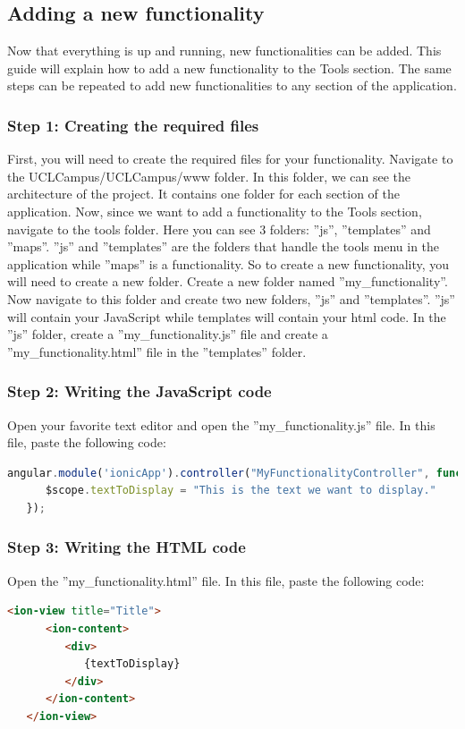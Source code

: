 \documentclass{eplmastersthesis}
\begin{document}
\subsection{Adding a new functionality}
Now that everything is up and running, new functionalities can be added. This guide will explain how to add a new functionality to the Tools section. The same steps can be repeated to add new functionalities to any section of the application.
\subsubsection{Step 1: Creating the required files}
First, you will need to create the required files for your functionality. Navigate to the UCLCampus/UCLCampus/www folder. In this folder, we can see the architecture of the project. It contains one folder for each section of the application. Now, since we want to add a functionality to the Tools section, navigate to the tools folder. Here you can see 3 folders: ''js'', ''templates'' and ''maps''. ''js'' and ''templates'' are the folders that handle the tools menu in the application while ''maps'' is a functionality. So to create a new functionality, you will need to create a new folder.
Create a new folder named ''my\_functionality''. Now navigate to this folder and create two new folders, ''js'' and ''templates''. ''js'' will contain your JavaScript while templates will contain your html code. In the ''js'' folder, create a ''my\_functionality.js'' file and create a ''my\_functionality.html'' file in the ''templates'' folder.
\subsubsection{Step 2: Writing the JavaScript code}
Open your favorite text editor and open the ''my\_functionality.js'' file. In this file, paste the following code:
\begin{lstlisting}[language=JavaScript]
   angular.module('ionicApp').controller("MyFunctionalityController", function($scope) {
      $scope.textToDisplay = "This is the text we want to display."
   });
\end{lstlisting} 
\subsubsection{Step 3: Writing the HTML code}
Open the ''my\_functionality.html'' file.   In this file, paste the following code:
\begin{lstlisting}[language=HTML]
   <ion-view title="Title">
      <ion-content>
         <div>
            {textToDisplay}
         </div>
      </ion-content>
   </ion-view>	
\end{lstlisting} 
\end{document}
